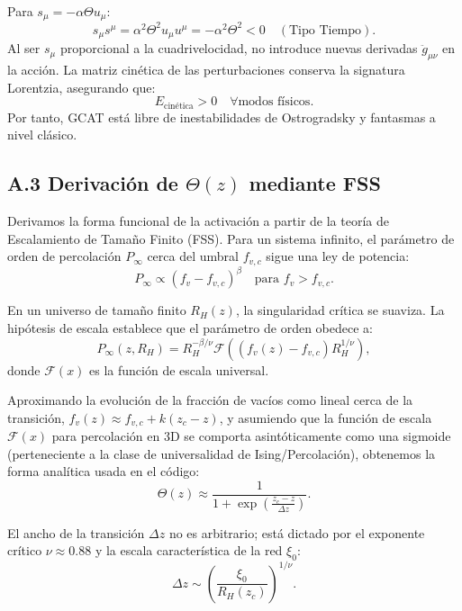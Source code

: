\documentclass[12pt, a4paper]{article}
\theoremstyle{plain}
\theoremstyle{definition}
\begin{document}
Para $s_\mu = -\alpha \Theta u_\mu$:
\begin{equation}
s_\mu s^\mu = \alpha^2 \Theta^2 u_\mu u^\mu = -\alpha^2 \Theta^2 < 0 \quad (\text{Tipo Tiempo}).
\end{equation}
Al ser $s_\mu$ proporcional a la cuadrivelocidad, no introduce nuevas derivadas $\ddot{g}_{\mu\nu}$ en la acción. La matriz cinética de las perturbaciones conserva la signatura Lorentzia, asegurando que:
\begin{equation}
E_{\text{cinética}} > 0 \quad \forall \text{modos físicos}.
\end{equation}
Por tanto, GCAT está libre de inestabilidades de Ostrogradsky y fantasmas a nivel clásico.

\subsection{A.3 Derivación de \texorpdfstring{$\Theta(z)$}{Theta(z)} mediante FSS}
\label{app:fss_derivation}

Derivamos la forma funcional de la activación a partir de la teoría de Escalamiento de Tamaño Finito (FSS).
Para un sistema infinito, el parámetro de orden de percolación $P_\infty$ cerca del umbral $f_{v,c}$ sigue una ley de potencia:
\begin{equation}
P_\infty \propto (f_v - f_{v,c})^\beta \quad \text{para } f_v > f_{v,c}.
\end{equation}

En un universo de tamaño finito $R_H(z)$, la singularidad crítica se suaviza. La hipótesis de escala establece que el parámetro de orden obedece a:
\begin{equation}
P_\infty(z, R_H) = R_H^{-\beta/\nu} \mathcal{F}\left( (f_v(z) - f_{v,c}) R_H^{1/\nu} \right),
\end{equation}
donde $\mathcal{F}(x)$ es la función de escala universal.

Aproximando la evolución de la fracción de vacíos como lineal cerca de la transición, $f_v(z) \approx f_{v,c} + k(z_c - z)$, y asumiendo que la función de escala $\mathcal{F}(x)$ para percolación en 3D se comporta asintóticamente como una sigmoide (perteneciente a la clase de universalidad de Ising/Percolación), obtenemos la forma analítica usada en el código:
\begin{equation}
\Theta(z) \approx \frac{1}{1 + \exp\left(\frac{z_c - z}{\Delta z}\right)}.
\end{equation}

El ancho de la transición $\Delta z$ no es arbitrario; está dictado por el exponente crítico $\nu \approx 0.88$ y la escala característica de la red $\xi_0$:
\begin{equation}
\Delta z \sim \left(\frac{\xi_0}{R_H(z_c)}\right)^{1/\nu}.
\end{equation}
\end{document}
